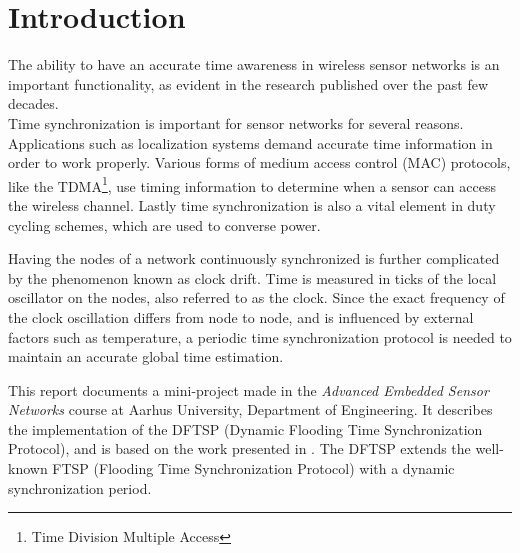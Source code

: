 \documentclass[Main]{subfiles}
\begin{document}
\section*{Introduction} %
\label{sec:introduction}

	The ability to have an accurate time awareness in wireless sensor networks is an important functionality, as evident in the research published over the past few decades\cite{FTSParticle,dynamicFTSParticle,RBSarticle,TPSNarticle}.
	\\Time synchronization is important for sensor networks for several reasons.
	Applications such as localization systems demand accurate time information in order to work properly.
	Various forms of medium access control (MAC) protocols, like the TDMA\footnote{Time Division Multiple Access}, use timing information to determine when a sensor can access the wireless channel.
	Lastly time synchronization is also a vital element in duty cycling schemes, which are used to converse power.

	Having the nodes of a network continuously synchronized is further complicated by the phenomenon known as clock drift. 
	Time is measured in ticks of the local oscillator on the nodes, also referred to as the clock.
	Since the exact frequency of the clock oscillation differs from node to node, and is influenced by external factors such as temperature, a periodic time synchronization protocol is needed to maintain an accurate global time estimation.

	This report documents a mini-project made in the \emph{Advanced Embedded Sensor Networks} course at Aarhus University, Department of Engineering. 
	It describes the implementation of the DFTSP (Dynamic Flooding Time Synchronization Protocol), and is based on the work presented in \cite{dynamicFTSParticle}. 
	The DFTSP extends the well-known FTSP (Flooding Time Synchronization Protocol)\cite{FTSParticle} with a dynamic synchronization period. 

\end{document}
